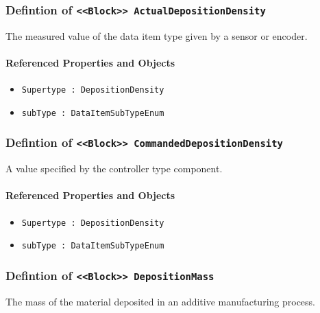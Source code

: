 \subsubsection{Defintion of \texttt{<<Block>> ActualDepositionDensity}}
  \label{type:ActualDepositionDensity}

\FloatBarrier

The measured value of the data item type given by a sensor or encoder.

\FloatBarrier
\paragraph{Referenced Properties and Objects}

\begin{itemize}
\item \texttt{Supertype : DepositionDensity}

\item \texttt{subType : DataItemSubTypeEnum}

\end{itemize}
\FloatBarrier
\subsubsection{Defintion of \texttt{<<Block>> CommandedDepositionDensity}}
  \label{type:CommandedDepositionDensity}

\FloatBarrier

A value specified by the controller type component.

\FloatBarrier
\paragraph{Referenced Properties and Objects}

\begin{itemize}
\item \texttt{Supertype : DepositionDensity}

\item \texttt{subType : DataItemSubTypeEnum}

\end{itemize}
\FloatBarrier
\subsubsection{Defintion of \texttt{<<Block>> DepositionMass}}
  \label{type:DepositionMass}

\FloatBarrier

The mass of the material deposited in an additive manufacturing process.

